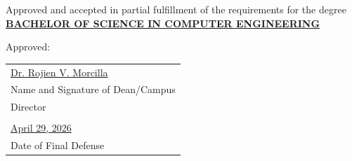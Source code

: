 {\vspace{0.1in}

\noindent Approved and accepted in partial fulfillment of the requirements for the degree \textbf{\underline{BACHELOR OF SCIENCE IN COMPUTER ENGINEERING}}

\vspace{0.1in}

\noindent Approved:

\vspace{0.05in}

\noindent \begin{tabular}{l}
    \underline{Dr. Rojien V. Morcilla} \\
    Name and Signature of Dean/Campus \\
    Director \\ \\
    \underline{April 29, 2026} \\
    Date of Final Defense
\end{tabular}
}